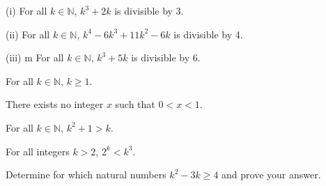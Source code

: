 \documentclass[12pt]{article}
\newenvironment{customprop}[1]{
  \renewcommand\theproposition{#1}
  \proposition
}{\endproposition}
\begin{document}
\begin{customprop}{2.18}
  \item[(i)] For all \( k \in \mathbb{N} \), \( k^3 + 2k \) is divisible by 3.
  \item[(ii)] For all \( k \in \mathbb{N} \), \( k^4 - 6k^3 + 11k^2 - 6k \) is divisible by 4.
  \item[(iii)]m For all \( k \in \mathbb{N} \), \( k^3 + 5k \) is divisible by 6.
\end{customprop}


\begin{customprop}{2.20}
  For all \( k \in \mathbb{N} \), \( k \geq 1 \).
\end{customprop}

\begin{customprop}{2.21}
  There exists no integer \( x \) such that \( 0 < x < 1 \).
\end{customprop}

\begin{customprop}{2.24}
  For all \( k \in \mathbb{N} \), \( k^2 + 1 > k \).
\end{customprop}

\begin{customprop}{2.27}
  For all integers \( k > 2 \), \( 2^k < k^3 \).
\end{customprop}

\begin{customprop}{2.28}
  Determine for which natural numbers \( k^2 - 3k \geq 4 \) and prove your answer.
\end{customprop}
\end{document}
